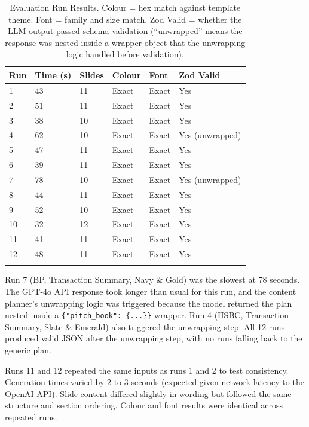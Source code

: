 \begin{longtable}{|l|l|l|l|l|l|}
\hline
\rowcolor{gray!20} \textbf{Run} & \textbf{Time (s)} & \textbf{Slides} & \textbf{Colour} & \textbf{Font} & \textbf{Zod Valid} \\
\hline
1 & 43 & 11 & Exact & Exact & Yes \\
\hline
2 & 51 & 11 & Exact & Exact & Yes \\
\hline
3 & 38 & 10 & Exact & Exact & Yes \\
\hline
4 & 62 & 10 & Exact & Exact & Yes (unwrapped) \\
\hline
5 & 47 & 11 & Exact & Exact & Yes \\
\hline
6 & 39 & 11 & Exact & Exact & Yes \\
\hline
7 & 78 & 10 & Exact & Exact & Yes (unwrapped) \\
\hline
8 & 44 & 11 & Exact & Exact & Yes \\
\hline
9 & 52 & 10 & Exact & Exact & Yes \\
\hline
10 & 32 & 12 & Exact & Exact & Yes \\
\hline
11 & 41 & 11 & Exact & Exact & Yes \\
\hline
12 & 48 & 11 & Exact & Exact & Yes \\
\hline
\caption{Evaluation Run Results. Colour = hex match against template theme. Font = family and size match. Zod Valid = whether the LLM output passed schema validation (``unwrapped'' means the response was nested inside a wrapper object that the unwrapping logic handled before validation).}
\label{tab:eval-results-full}
\end{longtable}

Run 7 (BP, Transaction Summary, Navy \& Gold) was the slowest at 78 seconds. The GPT-4o API response took longer than usual for this run, and the content planner's unwrapping logic was triggered because the model returned the plan nested inside a \texttt{\{"pitch\_book": \{...\}\}} wrapper. Run 4 (HSBC, Transaction Summary, Slate \& Emerald) also triggered the unwrapping step. All 12 runs produced valid JSON after the unwrapping step, with no runs falling back to the generic plan.

Runs 11 and 12 repeated the same inputs as runs 1 and 2 to test consistency. Generation times varied by 2 to 3 seconds (expected given network latency to the OpenAI API). Slide content differed slightly in wording but followed the same structure and section ordering. Colour and font results were identical across repeated runs.

